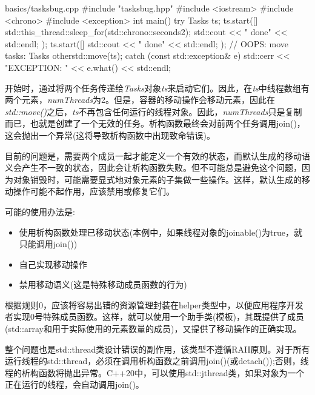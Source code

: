 \begin{codeboxt}[cpp]{basics/tasksbug.cpp}
#include "tasksbug.hpp"
#include <iostream>
#include <chrono>
#include <exception>
int main()
{
  try {
    Tasks ts;
    ts.start([]{
      std::this_thread::sleep_for(std::chrono::seconds{2});
      std::cout << " done" << std::endl;
    });
    ts.start([]{
      std::cout << " done" << std::endl;
    });
    // OOPS: move tasks:
    Tasks other{std::move(ts)};
  }
  catch (const std::exception& e) {
    std::cerr << "EXCEPTION: " << e.what() << std::endl;
  }
}
\end{codeboxt}

开始时，通过将两个任务传递给\textit{Tasks}对象\textit{ts}来启动它们。因此，在\textit{ts}中线程数组有两个元素，\textit{numThreads}为2。但是，容器的移动操作会移动元素，因此在\textit{std::move()}之后，\textit{ts}不再包含任何运行的线程对象。因此，\textit{numThreads}只是复制而已，也就是创建了一个无效的任务。析构函数最终会对前两个任务调用join()，这会抛出一个异常(这将导致析构函数中出现致命错误)。\par

目前的问题是，需要两个成员一起才能定义一个有效的状态，而默认生成的移动语义会产生不一致的状态，因此会让析构函数失败。但不可能总是避免这个问题，因为对象销毁时，可能需要显式地对象元素的子集做一些操作。这样，默认生成的移动操作可能不起作用，应该禁用或修复它们。\par

可能的使用办法是:\par

\begin{itemize}
  \item 使用析构函数处理已移动状态(本例中，如果线程对象的joinable()为true，就只能调用join())
  \item 自己实现移动操作
  \item 禁用移动语义(这是特殊移动成员函数的行为)
\end{itemize}

根据规则0，应该将容易出错的资源管理封装在helper类型中，以便应用程序开发者实现0号特殊成员函数。这样，就可以使用一个助手类(模板)，其既提供了成员(std::array和用于实际使用的元素数量的成员)，又提供了移动操作的正确实现。\par

整个问题也是std::thread类设计错误的副作用，该类型不遵循RAII原则。对于所有运行线程的std::thread，必须在调用析构函数之前调用join()(或detach());否则，线程的析构函数将抛出异常。C++20中，可以使用std::jthread类，如果对象为一个正在运行的线程，会自动调用join()。\par



